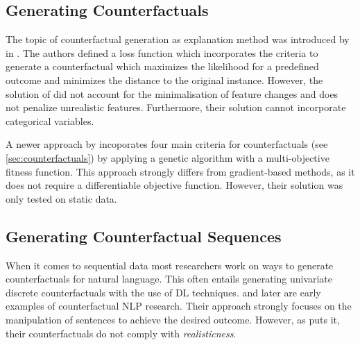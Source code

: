 \documentclass[./../../paper.tex]{subfiles}
\begin{document}
\subsection{Generating Counterfactuals}
The topic of counterfactual generation as explanation method was introduced by \citeauthor{wachter_CounterfactualExplanationsOpening_2017} in \citeyear{wachter_CounterfactualExplanationsOpening_2017}\autocite{wachter_CounterfactualExplanationsOpening_2017}. The authors defined a loss function which incorporates the criteria to generate a counterfactual which maximizes the likelihood for a predefined outcome and minimizes the distance to the original instance. However, the solution of \citeauthor{wachter_CounterfactualExplanationsOpening_2017} did not account for the minimalisation of feature changes and does not penalize unrealistic features. Furthermore, their solution cannot incorporate categorical variables.

A newer approach by \citeauthor{dandl_MultiObjectiveCounterfactualExplanations_2020} incoporates four main criteria for counterfactuals (see \autoref{sec:counterfactuals}) by applying a genetic algorithm with a multi-objective fitness function\autocite{dandl_MultiObjectiveCounterfactualExplanations_2020}. This approach strongly differs from gradient-based methods, as it does not require a differentiable objective function. However, their solution was only tested on static data.

\subsection{Generating Counterfactual Sequences}
When it comes to sequential data most researchers work on ways to generate counterfactuals for natural language. This often entails generating univariate discrete counterfactuals with the use of \gls{DL} techniques. \citeauthor{martens_Explainingdatadrivendocument_2014} and later \citeauthor{krause_InteractingPredictionsVisual_2016} are early examples of counterfactual NLP research\autocites{martens_Explainingdatadrivendocument_2014,krause_InteractingPredictionsVisual_2016}. Their approach strongly focuses on the manipulation of sentences to achieve the desired outcome. However, as \citeauthor{robeer_GeneratingRealisticNatural_2021} puts it, their counterfactuals do not comply with \emph{realisticness}\autocite{robeer_GeneratingRealisticNatural_2021}.
\end{document}
